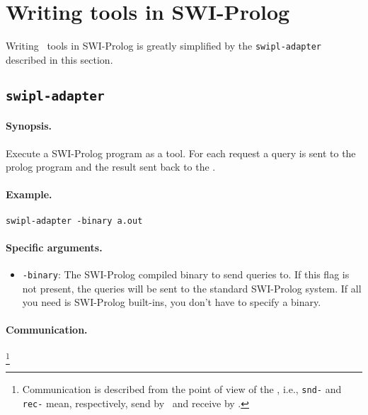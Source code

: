 
%
%
\section{Writing tools in SWI-Prolog}

Writing \TB\ tools in SWI-Prolog is greatly simplified by the
{\tt swipl-adapter} described in this section.

\subsection{\tt swipl-adapter}

\paragraph{Synopsis.} Execute a SWI-Prolog program as a tool. For each request
a query is sent to the prolog program and the result sent back to the \TB.

\paragraph{Example.} {\tt swipl-adapter -binary a.out}

\paragraph{Specific arguments.}
\begin{itemize}
\item {\tt -binary}: The SWI-Prolog compiled binary to send queries to.
If this flag is not present, the queries will be sent to the standard
SWI-Prolog system. If all you need is SWI-Prolog built-ins, you don't have
to specify a binary.
\end{itemize}

\paragraph{Communication.} \hspace{-0.3cm}\footnote{Communication is described
from the point of view of the \TB, i.e., {\tt snd-} and {\tt rec-}
mean, respectively, send by \TB\ and receive by \TB.}

